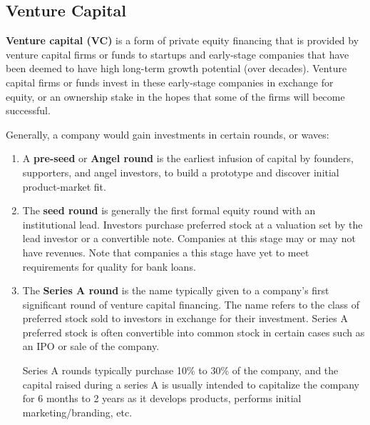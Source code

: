 \documentclass{article}
\begin{document}
  \subsection{Venture Capital}

    \begin{definition}
      \textbf{Venture capital (VC)} is a form of private equity financing that is provided by venture capital firms or funds to startups and early-stage companies that have been deemed to have high long-term growth potential (over decades). Venture capital firms or funds invest in these early-stage companies in exchange for equity, or an ownership stake in the hopes that some of the firms will become successful. 

      Generally, a company would gain investments in certain rounds, or waves:
      \begin{enumerate}
        \item A \textbf{pre-seed} or \textbf{Angel round} is the earliest infusion of capital by founders, supporters, and angel investors, to build a prototype and discover initial product-market fit. 
        \item The \textbf{seed round} is generally the first formal equity round with an institutional lead. Investors purchase preferred stock at a valuation set by the lead investor or a convertible note. Companies at this stage may or may not have revenues. Note that companies a this stage have yet to meet requirements for quality for bank loans. 
        \item The \textbf{Series A round} is the name typically given to a company's first significant round of venture capital financing. The name refers to the class of preferred stock sold to investors in exchange for their investment. Series A preferred stock is often convertible into common stock in certain cases such as an IPO or sale of the company. 
        
        Series A rounds typically purchase 10\% to 30\% of the company, and the capital raised during a series A is usually intended to capitalize the company for 6 months to 2 years as it develops products, performs initial marketing/branding, etc. 
        

\end{enumerate}
\end{definition}
\end{document}
